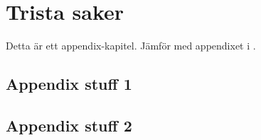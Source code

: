 \chapter{Trista saker}\label{cha:boring}

Detta är ett appendix-kapitel.  Jämför med appendixet i .

\section{Appendix stuff 1}

\section{Appendix stuff 2}
